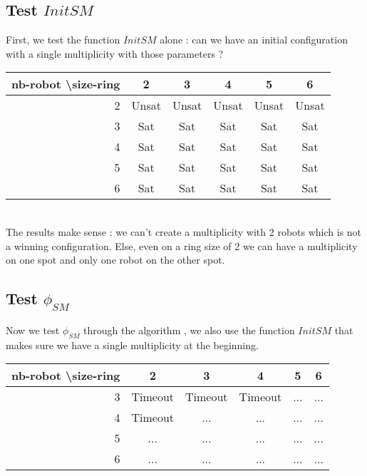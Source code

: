 \documentclass{article}
\begin{document}
\subsection{Test $InitSM$}

First, we test the function $InitSM$ alone : can we have an initial configuration with a single multiplicity with those parameters ?\\

\begin{tabular}{|r|c|c|c|c|c|}
  \hline
  nb-robot \textbackslash size-ring & 2 & 3 & 4 & 5 & 6\\
  \hline
  2 & Unsat & Unsat & Unsat & Unsat & Unsat \\
  \hline
  3 & Sat & Sat & Sat & Sat & Sat \\
  \hline
  4 & Sat & Sat & Sat & Sat & Sat \\
  \hline
  5 & Sat & Sat & Sat & Sat & Sat \\
  \hline
  6 & Sat & Sat & Sat & Sat & Sat \\
  \hline
\end{tabular}
\\

The results make sense : we can't create a multiplicity with 2 robots which is not a winning configuration. Else, even on a ring size of 2 we can have a multiplicity on one spot and only one robot on the other spot.

\subsection{Test $\phi_{SM}$}

Now we test $\phi_{SM}$ through the algorithm \cite{algo}, we also use the function $InitSM$ that makes sure we have a single multiplicity at the beginning.\\

\begin{tabular}{|r|c|c|c|c|c|}
  \hline
  nb-robot \textbackslash size-ring & 2 & 3 & 4 & 5 & 6\\
  \hline
  3 & Timeout & Timeout & Timeout & ... & ... \\
  \hline
  4 & Timeout & ... & ... & ... & ... \\
  \hline
  5 & ... & ... & ... & ... & ... \\
  \hline
  6 & ... & ... & ... & ... & ... \\
  \hline
\end{tabular}
\\
\end{document}
